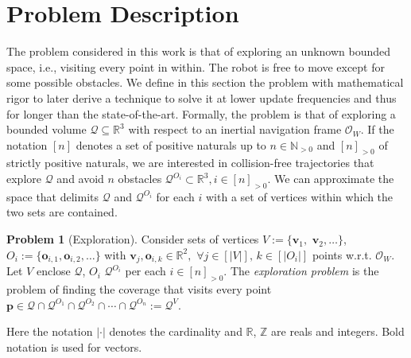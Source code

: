 \documentclass[lettersize,journal,twoside]{IEEEtran}
\theoremstyle{definition}
\newtheorem*{pb}{Problem}%
\begin{document}


\section{Problem Description}
\label{sec:pf}
\noindent
The problem considered in this work %
is that of exploring an unknown bounded space, i.e., visiting %
every point in within.
The robot is free to move except for %
some possible obstacles.
We define in this section the problem with mathematical rigor to later derive a technique to solve it at lower update frequencies and thus for longer than the state-of-the-art. 
Formally, the problem 
is that of exploring a bounded volume $\mathcal{Q}\subseteq\mathbb{R}^3$ with respect to an inertial navigation frame $\mathcal{O}_W$. If the notation $[n]$ denotes a set of positive naturals up to $n\in\mathbb{N}_{>0}$ and $[n]_{>0}$ of strictly positive naturals, we are interested in collision-free trajectories that explore $\mathcal{Q}$ and avoid $n$ obstacles $\mathcal{Q}^{O_i}\subset\mathbb{R}^3,i\in[n]_{>0}$. We can approximate the space that delimits $\mathcal{Q}$ and $\mathcal{Q}^{O_i}$ for each $i$ with a set of vertices within which the two sets are contained.

\begin{pb}[Exploration]
  Consider sets of vertices $V:=\{\mathbf{v}_1,$ $\mathbf{v}_2,\dots\}$, $O_i:=\{\mathbf{o}_{i,1},\mathbf{o}_{i,2},\dots\}$ with $\mathbf{v}_j,\mathbf{o}_{i,k}\in\mathbb{R}^2,$ $\forall j\in[|V|],\,k\in[|O_i|]$ points w.r.t. $\mathcal{O}_W$. Let $V$ enclose $\mathcal{Q}$, $O_i$ $\mathcal{Q}^{O_i}$ per each $i\in[n]_{>0}$. The \textit{exploration problem} is the problem of finding the coverage that visits %
  every point $\mathbf{p}\in\mathcal{Q}\cap\mathcal{Q}^{O_1}\cap\mathcal{Q}^{O_2}\cap\cdots\cap\mathcal{Q}^{O_n}:=\mathcal{Q}^V$.
\end{pb}

Here the notation $|\cdot|$ denotes the cardinality and $\mathbb{R}$, $\mathbb{Z}$ are reals and integers. Bold notation is used for vectors.
\end{document}
